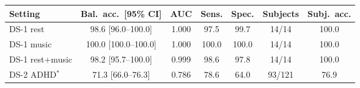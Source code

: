 \small
\begin{tabular}{lcccccc}
\hline
Setting & Bal.\ acc.\ [95\% CI] & AUC & Sens. & Spec. & Subjects & Subj.\ acc. \\
\hline
DS-1 rest & 98.6 [96.0--100.0] & 1.000 & 97.5 & 99.7 & 14/14 & 100.0 \\
DS-1 music & 100.0 [100.0--100.0] & 1.000 & 100.0 & 100.0 & 14/14 & 100.0 \\
DS-1 rest+music & 98.2 [95.7--100.0] & 0.999 & 98.6 & 97.8 & 14/14 & 100.0 \\
DS-2 ADHD$^\ast$ & 71.3 [66.0--76.3] & 0.786 & 78.6 & 64.0 & 93/121 & 76.9 \\
\hline
\end{tabular}
